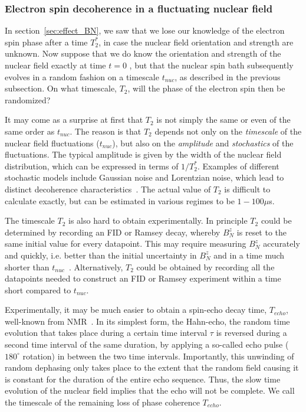 \documentclass[rmp,twocolumn,aps]{revtex4}
\begin{document}

\subsubsection{Electron spin decoherence in a fluctuating nuclear field}
\label{sec:T2_BN}

In section~\ref{sec:effect_BN}, we saw that we lose our knowledge of the electron spin phase after a time $T_2^*$, in case the nuclear field orientation and strength are unknown. Now suppose that we do know the orientation and strength of the nuclear field exactly at time $t=0$ , but that the nuclear spin bath subsequently evolves in a random fashion on a timescale $t_{nuc}$, as described in the previous subsection. On what timescale, $T_2$, will the phase of the electron spin then be randomized?

It may come as a surprise at first that $T_2$ is not simply the same or even of the same order as $t_{nuc}$. The reason is that $T_2$ depends not only on the \emph{timescale} of the nuclear field fluctuations ($t_{nuc}$), but also on the \emph{amplitude} and \emph{stochastics} of the fluctuations. The typical amplitude is given by the width of the nuclear field distribution, which can be expressed in terms of $1/T_2^*$. Examples of different stochastic models include Gaussian noise and Lorentzian noise, which lead to distinct decoherence characteristics~\cite{klauder62,sousa06}.  The actual value of $T_2$ is difficult to calculate exactly, but can be estimated in various regimes to be $1 - 100 \mu$s. 

The timescale $T_2$ is also hard to obtain experimentally. In principle $T_2$ could be determined by recording an FID or Ramsey decay, whereby $B_N^z$ is reset to the same initial value for every datapoint. This may require measuring $B_N^z$ accurately and quickly, i.e. better than the initial uncertainty in $B_N^z$ and in a time much shorter than $t_{nuc}$~\cite{klauser06,stepanenko06,giedke06}. Alternatively, $T_2$ could be obtained by recording all the datapoints needed to construct an FID or Ramsey experiment within a time short compared to $t_{nuc}$.

Experimentally, it may be much easier to obtain a spin-echo decay time, $T_{echo}$, well-known from NMR~\cite{vandersypen04c,freeman97}. In its simplest form, the Hahn-echo, the random time evolution that takes place during a certain time interval $\tau$ is reversed during a second time interval of the same duration, by applying a so-called echo pulse ($180^\circ$ rotation) in between the two time intervals. Importantly, this unwinding of random dephasing only takes place to the extent that the random field causing it is constant for the duration of the entire echo sequence. Thus, the slow time evolution of the nuclear field implies that the echo will not be complete. We call the timescale of the remaining loss of phase coherence $T_{echo}$.
\end{document}
